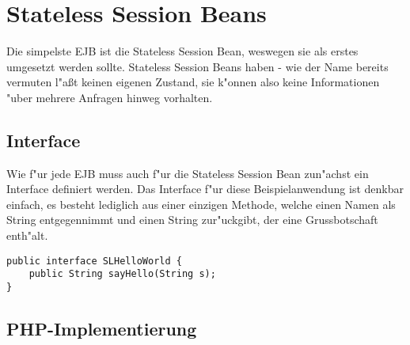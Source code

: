 \section{Stateless Session Beans}
\label{sec:chap2:slsb}

Die simpelste EJB ist die Stateless Session Bean, weswegen sie als erstes umgesetzt werden sollte.
Stateless Session Beans haben - wie der Name bereits vermuten l"a\ss t keinen eigenen Zustand, sie
k"onnen also keine Informationen "uber mehrere Anfragen hinweg vorhalten.

\subsection{Interface}
\label{sec:chap2:slsb:if}
Wie f"ur jede EJB muss auch f"ur die Stateless Session Bean zun"achst ein Interface definiert werden.
Das Interface f"ur diese Beispielanwendung ist denkbar einfach, es besteht lediglich aus einer einzigen
Methode, welche einen Namen als String entgegennimmt und einen String zur"uckgibt, der eine
Grussbotschaft enth"alt. 
\begin{lstlisting}[caption=Stateless Hello World Interface]
public interface SLHelloWorld {
    public String sayHello(String s);
}
\end{lstlisting}

\subsection{PHP-Implementierung}
\label{sec:chap2:slsb:impl}


